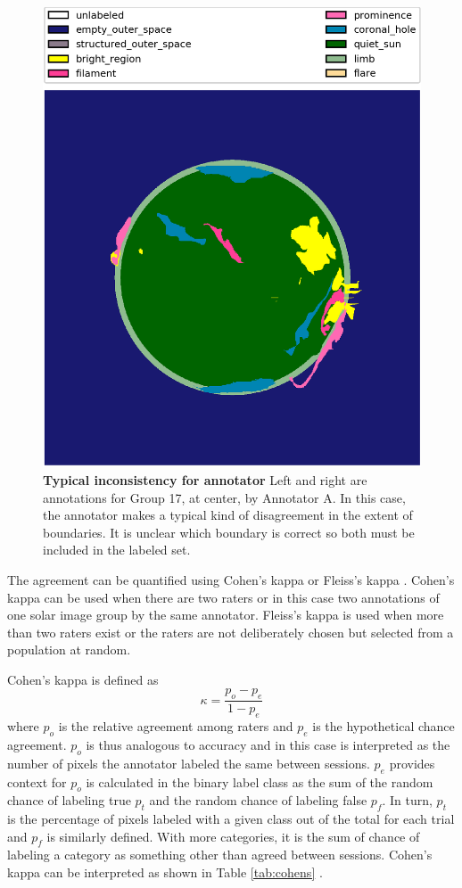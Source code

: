 \documentclass[twoside]{report}
\begin{document}
\begin{figure}[ht]
\begin{center}
    \includegraphics[scale=0.1]{g20171102000206-1}
    \caption{{\bf Typical inconsistency for annotator} Left and right are annotations for Group 17, at center, by Annotator A. In this case, the annotator makes a typical kind of disagreement in the extent of boundaries. It is unclear which boundary is correct so both must be included in the labeled set.} 
    \label{fig:annotatorconsistency2}
 \end{center}
\end{figure}

The agreement can be quantified using Cohen's kappa or Fleiss's kappa \cite{landiskoch}. Cohen's kappa can be used when there are two raters or in this case two annotations of one solar image group by the same annotator. Fleiss's kappa is used when more than two raters exist or the raters are not deliberately chosen but selected from a population at random. 

Cohen's kappa is defined as 
\[\kappa = \frac{p_o - p_e}{1-p_e} \] where $p_o$ is the relative agreement among raters and $p_e$ is the hypothetical chance agreement. $p_o$ is thus analogous to accuracy and in this case is interpreted as the number of pixels the annotator labeled the same between sessions. $p_e$ provides context for $p_o$ is calculated in the binary label class as the sum of the random chance of labeling true $p_t$ and the random chance of labeling false $p_f$. In turn, $p_t$ is the percentage of pixels labeled with a given class out of the total for each trial and $p_f$ is similarly defined. With more categories, it is the sum of chance of labeling a category as something other than agreed between sessions. Cohen's kappa can be interpreted as shown in Table \ref{tab:cohens} \cite{cohens}.
\end{document}
